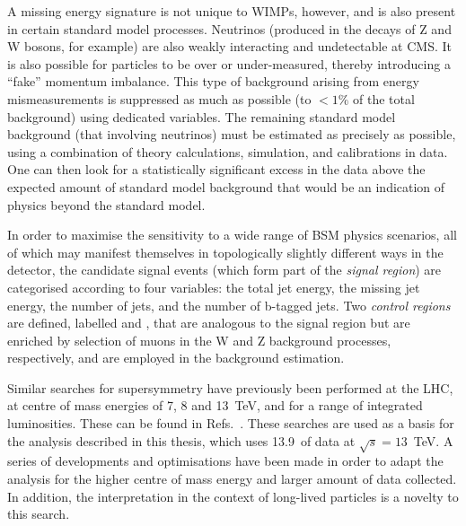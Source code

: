 A missing energy signature is not unique to WIMPs, however, and is also present 
in certain standard model processes. Neutrinos (produced in the decays of Z and 
W bosons, for example) are also weakly interacting and undetectable at CMS. It 
is also possible for particles to be over or under-measured, thereby 
introducing a ``fake'' momentum imbalance. This type of background arising from 
energy mismeasurements is suppressed as much as possible (to $<1\%$ of the 
total background) using dedicated variables. %
The remaining standard 
model background (that involving neutrinos) must be estimated as precisely as 
possible, using a combination of theory calculations, simulation, and 
calibrations in data. %
One can then look for a 
statistically significant excess in the data above the expected amount of 
standard model background that would be an indication of %
physics beyond the standard model. %

In order to maximise the sensitivity to a wide range of BSM physics %
scenarios, 
all of which may manifest themselves in topologically slightly different ways 
in the detector, the candidate signal events (which form part of the 
\textit{signal region}) are categorised according to four variables: the total 
jet energy, the missing jet energy, the number of jets, and the number of 
b-tagged jets. %
Two \textit{control regions} are defined, labelled \mj and 
\mmj, that are analogous to the signal region but are enriched by 
selection of muons in the W and Z background processes, respectively, and are 
employed in the background estimation.%

Similar searches for supersymmetry have previously been performed %
at the LHC, at centre of mass energies of 7, 8 and 13~TeV, and for a range of 
integrated luminosities. These can be found in 
Refs.~\cite{alphat1,alphat2,alphat3,alphat4,alphat5}. These 
searches are used as a basis for the analysis described in this thesis, which 
uses 13.9~\ifb of data at $\sqrt{s}=13$~TeV. A 
series of developments and optimisations have been made in order to adapt the 
analysis for the higher centre of mass energy and larger amount of data 
collected. In addition, the interpretation in the context of %
long-lived particles %
is a novelty to this search.


